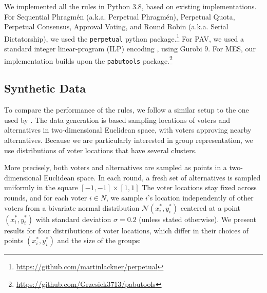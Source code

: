 \documentclass[10pt]{scrartcl}
\theoremstyle{plain}
\theoremstyle{definition}
\begin{document}
We implemented all the rules in Python 3.8, based on existing implementations. For Sequential Phragm\'en  (a.k.a. Perpetual Phragm\'en), Perpetual Quota, Perpetual Consensus, Approval Voting, and Round Robin (a.k.a. Serial Dictatorship), we used the \texttt{perpetual} python package.\footnote{\url{https://github.com/martinlackner/perpetual}} 
For PAV, we used a standard integer linear-program (ILP) encoding \citep{peters2020preferences}, using Gurobi 9. For MES, our implementation builds upon the \texttt{pabutools} package.\footnote{\url{https://github.com/Grzesiek3713/pabutools}}



\subsection{Synthetic Data}
\label{sec:experiments:synthetic}

To compare the performance of the rules, we follow a similar setup to the one used by \cite{lackner2020perpetual}. The data generation is based sampling locations of voters and alternatives in two-dimensional Euclidean space, with voters approving nearby alternatives. Because we are particularly interested in group representation, we use distributions of voter locations that have several clusters. 

More precisely, both voters and alternatives are sampled as points in a two-dimensional Euclidean space. In each round, a fresh set of alternatives is sampled uniformly in the square $[-1, -1] \times [1, 1]$ The voter locations stay fixed across rounds, and for each voter $i \in N$, we sample $i$'s location independently of other voters from a bivariate normal distribution $\mathcal{N}(x^*_i, y^*_i)$ centered at a point $(x^*_i, y^*_i)$ with standard deviation $\sigma = 0.2$ (unless stated otherwise). We present results for four distributions of voter locations, which differ in their choices of points $(x^*_i, y^*_i)$ and the size of the groups:
\end{document}
